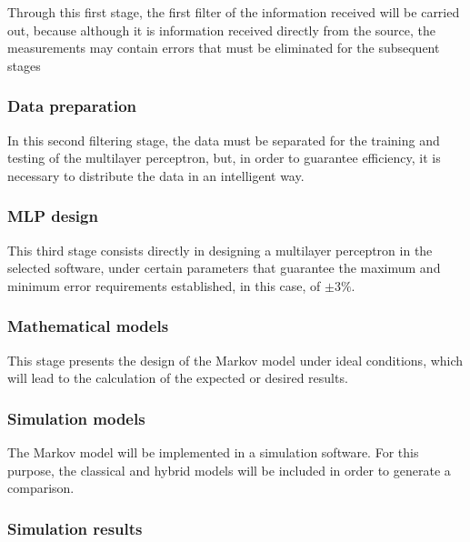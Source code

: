 \documentclass{article}
\begin{document}
\begin{doublespacing}
\par Through this first stage, the first filter of the information received will be carried out, because although it is information received directly from the source, the measurements may contain errors that must be eliminated for the subsequent stages

\subsubsection{Data preparation} 

\par In this second filtering stage, the data must be separated for the training and testing of the multilayer perceptron, but, in order to guarantee efficiency, it is necessary to distribute the data in an intelligent way.

\subsubsection{MLP design} 

\par This third stage consists directly in designing a multilayer perceptron in the selected software, under certain parameters that guarantee the maximum and minimum error requirements established, in this case, of $ \pm 3\%$. 

\subsubsection{Mathematical models} 

\par This stage presents the design of the Markov model under ideal conditions, which will lead to the calculation of the expected or desired results.

\subsubsection{Simulation models} 

\par The Markov model will be implemented in a simulation software. For this purpose, the classical and hybrid models will be included in order to generate a comparison. 

\subsubsection{Simulation results} 


\end{doublespacing}
\end{document}
